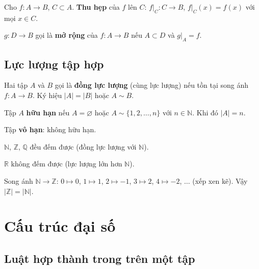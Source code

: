 \documentclass[12pt,a4paper]{article}
\begin{document}
\begin{dinhnghia}
  Cho $f: A \to B$, $C \subset A$. \textbf{Thu hẹp} của $f$ lên $C$: $f|_C: C \to B$, $f|_C(x) = f(x)$ với mọi $x \in C$.
\end{dinhnghia}

\begin{dinhnghia}
  $g: D \to B$ gọi là \textbf{mở rộng} của $f: A \to B$ nếu $A \subset D$ và $g|_A = f$.
\end{dinhnghia}

\subsection{Lực lượng tập hợp}

\begin{dinhnghia}
  Hai tập $A$ và $B$ gọi là \textbf{đồng lực lượng} (cùng lực lượng) nếu tồn tại song ánh $f: A \to B$. Ký hiệu $|A| = |B|$ hoặc $A \sim B$.
\end{dinhnghia}

\begin{dinhnghia}
  Tập $A$ \textbf{hữu hạn} nếu $A = \varnothing$ hoặc $A \sim \{1, 2, \ldots, n\}$ với $n \in \mathbb{N}$. Khi đó $|A| = n$. 
  
  Tập \textbf{vô hạn}: không hữu hạn.
\end{dinhnghia}

\begin{dinhly}
  $\mathbb{N}$, $\mathbb{Z}$, $\mathbb{Q}$ đều đếm được (đồng lực lượng với $\mathbb{N}$). 
  
  $\mathbb{R}$ không đếm được (lực lượng lớn hơn $\mathbb{N}$).
\end{dinhly}

\begin{vidu}
  Song ánh $\mathbb{N} \to \mathbb{Z}$: $0 \mapsto 0$, $1 \mapsto 1$, $2 \mapsto -1$, $3 \mapsto 2$, $4 \mapsto -2$, $\ldots$ (xếp xen kẽ). Vậy $|\mathbb{Z}| = |\mathbb{N}|$.
\end{vidu}

\section{Cấu trúc đại số}

\subsection{Luật hợp thành trong trên một tập}
\end{document}
